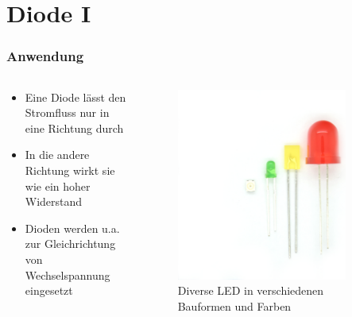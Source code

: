 
\section{Diode I}
\label{section:diode_1}
\begin{frame}%

\frametitle{Anwendung}
\begin{columns}
    \begin{column}{0.48\textwidth}
    \begin{itemize}
  \item Eine Diode lässt den Stromfluss nur in eine Richtung durch
  \item In die andere Richtung wirkt sie wie ein hoher Widerstand
  \item Dioden werden u.a. zur Gleichrichtung von Wechselspannung eingesetzt
  \end{itemize}

    \end{column}
   \begin{column}{0.48\textwidth}
       
\begin{figure}
    \includegraphics[width=0.85\textwidth]{foto/6}
    \caption{\scriptsize Diverse LED in verschiedenen Bauformen und Farben}
    \label{e_led}
\end{figure}

   \end{column}
\end{columns}

\end{frame}

